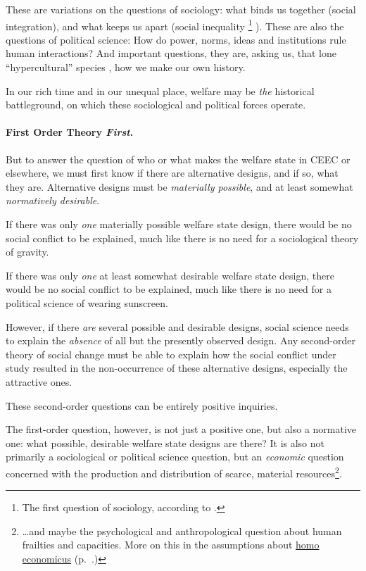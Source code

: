 \documentclass[11pt,a4paper,oneside]{article}
\begin{document}
These are variations on the questions of sociology: 
what binds us together (social integration), and what keeps us apart (social inequality
\footnote{
	The first question of sociology, according to \citep[66]{Dahrendorf1966}.
}
). 
These are also the questions of political science: 
How do power, norms, ideas and institutions rule human interactions? 
And important questions, they are, asking us, that lone ``hypercultural'' species \citep{Henrich2004}, how we make our own history. 

In our rich time and in our unequal place, welfare may be \emph{the} historical battleground, on which these sociological and political forces operate. 

\paragraph{First Order Theory \emph{First}.} But to answer the question of who or what makes the welfare state in \gls{CEEC} or elsewhere, we must first know if there are alternative designs, and if so, what they are. 
Alternative designs must be \emph{materially possible}, and at least somewhat \emph{normatively desirable}.

If there was only \emph{one} materially possible welfare state design, there would be no social conflict to be explained, much like there is no need for a sociological theory of gravity. 

If there was only \emph{one} at least somewhat desirable welfare state design, there would be no social conflict to be explained, much like there is no need for a political science of wearing sunscreen.

However, if there \emph{are} several possible and desirable designs, social science needs to explain the \emph{absence} of all but the presently observed design. 
Any second-order theory of social change must be able to explain how the social conflict under study resulted in the non-occurrence of these alternative designs, especially the attractive ones. 

These second-order questions can be entirely positive inquiries.

The first-order question, however, is not just a positive one, but also a normative one: 
what possible, desirable welfare state designs are there? 
It is also not primarily a sociological or political science question, but an \emph{economic} question concerned with the production and distribution of scarce, material resources\footnote{
	\ldots and maybe the psychological and anthropological question about human frailties and capacities. More on this in the assumptions about \hyperref[it:homo-economicus]{homo economicus} (p.~\pageref{it:homo-economicus}.)
}.
\end{document}
